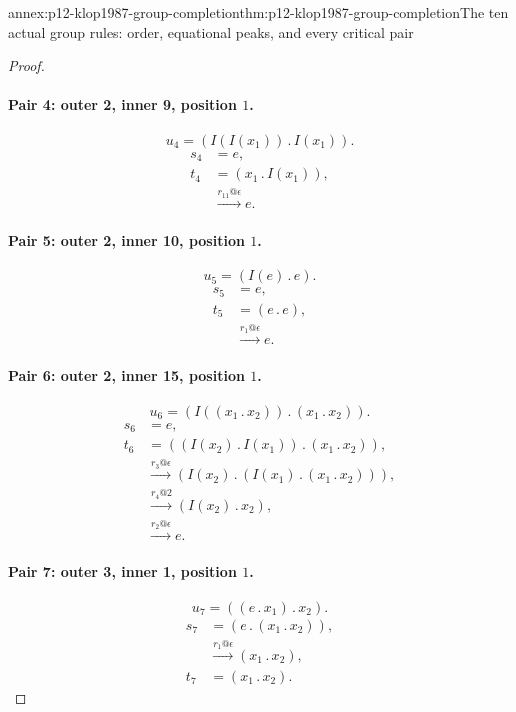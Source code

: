 \begin{annexitem}{annex:p12-klop1987-group-completion}{thm:p12-klop1987-group-completion}{The ten actual group rules: order, equational peaks, and every critical pair}
\begin{proof}
\paragraph{Pair 4: outer 2, inner 9, position \(1\).}
\[
 u_{4}=(I(I(x_{1}))\mathbin{.}I(x_{1})).
\]
\begin{align*}
 s_{4}&=e,\\
 t_{4}&=(x_{1}\mathbin{.}I(x_{1})),\\
 &\xrightarrow{r_{11}@\epsilon}e.
\end{align*}

\paragraph{Pair 5: outer 2, inner 10, position \(1\).}
\[
 u_{5}=(I(e)\mathbin{.}e).
\]
\begin{align*}
 s_{5}&=e,\\
 t_{5}&=(e\mathbin{.}e),\\
 &\xrightarrow{r_{1}@\epsilon}e.
\end{align*}

\paragraph{Pair 6: outer 2, inner 15, position \(1\).}
\[
 u_{6}=(I((x_{1}\mathbin{.}x_{2}))\mathbin{.}(x_{1}\mathbin{.}x_{2})).
\]
\begin{align*}
 s_{6}&=e,\\
 t_{6}&=((I(x_{2})\mathbin{.}I(x_{1}))\mathbin{.}(x_{1}\mathbin{.}x_{2})),\\
 &\xrightarrow{r_{3}@\epsilon}(I(x_{2})\mathbin{.}(I(x_{1})\mathbin{.}(x_{1}\mathbin{.}x_{2}))),\\
 &\xrightarrow{r_{4}@2}(I(x_{2})\mathbin{.}x_{2}),\\
 &\xrightarrow{r_{2}@\epsilon}e.
\end{align*}

\paragraph{Pair 7: outer 3, inner 1, position \(1\).}
\[
 u_{7}=((e\mathbin{.}x_{1})\mathbin{.}x_{2}).
\]
\begin{align*}
 s_{7}&=(e\mathbin{.}(x_{1}\mathbin{.}x_{2})),\\
 &\xrightarrow{r_{1}@\epsilon}(x_{1}\mathbin{.}x_{2}),\\
 t_{7}&=(x_{1}\mathbin{.}x_{2}).
\end{align*}


\end{proof}
\end{annexitem}
